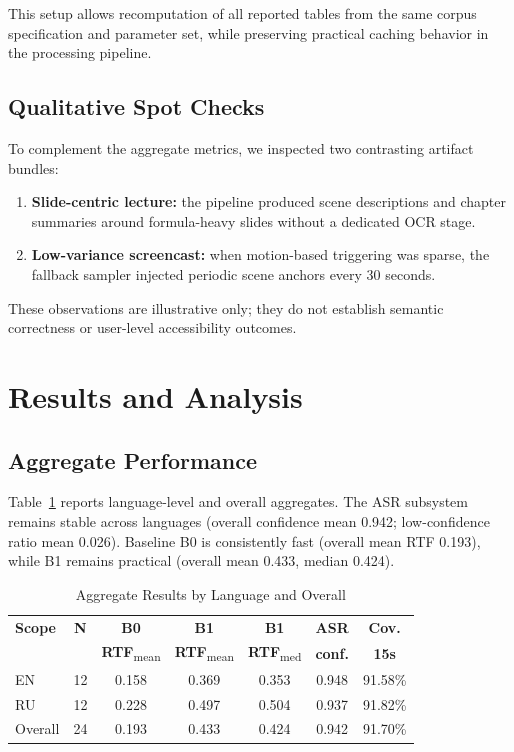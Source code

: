 \documentclass[conference]{IEEEtran}
\begin{document}
This setup allows recomputation of all reported tables from the same corpus specification and parameter set, while preserving practical caching behavior in the processing pipeline.

\subsection{Qualitative Spot Checks}
To complement the aggregate metrics, we inspected two contrasting artifact bundles:
\begin{enumerate}
\item \textbf{Slide-centric lecture:} the pipeline produced scene descriptions and chapter summaries around formula-heavy slides without a dedicated OCR stage.
\item \textbf{Low-variance screencast:} when motion-based triggering was sparse, the fallback sampler injected periodic scene anchors every 30 seconds.
\end{enumerate}

These observations are illustrative only; they do not establish semantic correctness or user-level accessibility outcomes.

\FloatBarrier
\section{Results and Analysis}
\subsection{Aggregate Performance}
Table~\ref{tab:lang_overall} reports language-level and overall aggregates. The ASR subsystem remains stable across languages (overall confidence mean 0.942; low-confidence ratio mean 0.026). Baseline B0 is consistently fast (overall mean RTF 0.193), while B1 remains practical (overall mean 0.433, median 0.424).

\begin{table}[t]
\caption{Aggregate Results by Language and Overall}
\label{tab:lang_overall}
\centering
\footnotesize
\setlength{\tabcolsep}{4.2pt}
\begin{tabular}{lcccccc}
\toprule
\textbf{Scope} & \textbf{N} & \textbf{B0} & \textbf{B1} & \textbf{B1} & \textbf{ASR} & \textbf{Cov.} \\
 &  & \textbf{RTF}\textsubscript{mean} & \textbf{RTF}\textsubscript{mean} & \textbf{RTF}\textsubscript{med} & \textbf{conf.} & \textbf{15s} \\
\midrule
EN & 12 & 0.158 & 0.369 & 0.353 & 0.948 & 91.58\% \\
RU & 12 & 0.228 & 0.497 & 0.504 & 0.937 & 91.82\% \\
Overall & 24 & 0.193 & 0.433 & 0.424 & 0.942 & 91.70\% \\
\bottomrule
\end{tabular}
\end{table}
\end{document}
